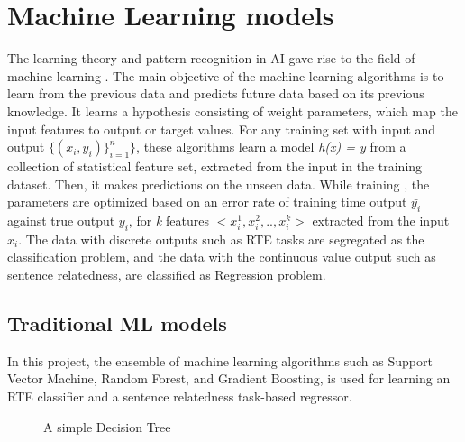 \documentclass[12pt]{report} %
\begin{document}
\section{Machine Learning models}
\label{ml_model}

The learning theory and pattern recognition in AI gave rise to the field of machine learning \citep{jurafsky2014speech}. The main objective of the machine learning algorithms is to learn from the previous data and predicts future data based on its previous knowledge. It learns a hypothesis consisting of weight parameters, which map the input features to output or target values. For any training set with input and output $\{(x_{i},y_{i})\}_{i=1}^{n}\}$, these algorithms learn a model \textit{h(x) = y} from a collection of statistical feature set, extracted from the input in the training dataset. Then, it makes predictions on the unseen data.  While training , the parameters are optimized based on an error rate of training time output $\bar{y_{i}}$ against true output $y_{i}$, for \textit{k} features $<x^{1}_{i},x^{2}_{i},..,x^{k}_{i}>$ extracted from the input $x_{i}$. The data with discrete outputs such as RTE tasks are segregated as the classification problem, and  the data with the continuous value output such as sentence relatedness, are classified as Regression problem. 

\subsection{Traditional ML models}

In this project, the ensemble of machine learning algorithms such as Support Vector Machine, Random Forest, and Gradient Boosting, is used for learning an RTE classifier and a sentence relatedness task-based regressor. 

\begin{figure}[!tbp]
	\centering
	\caption{A simple Decision Tree}
	\label{tree}
\end{figure}
\end{document}
